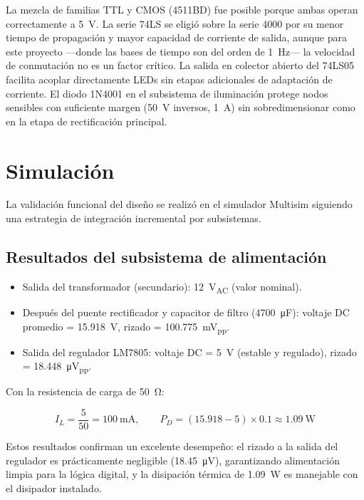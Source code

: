 \documentclass[10pt,onecolumn]{IEEEtran}
\begin{document}
La mezcla de familias TTL y CMOS (4511BD) fue posible porque ambas operan correctamente a \SI{5}{\volt}. La serie 74LS se eligió sobre la serie 4000 por su menor tiempo de propagación y mayor capacidad de corriente de salida, aunque para este proyecto —donde las bases de tiempo son del orden de \SI{1}{\hertz}— la velocidad de conmutación no es un factor crítico. La salida en colector abierto del 74LS05 facilita acoplar directamente LEDs sin etapas adicionales de adaptación de corriente. El diodo 1N4001 en el subsistema de iluminación protege nodos sensibles con suficiente margen (\SI{50}{\volt} inversos, \SI{1}{\ampere}) sin sobredimensionar como en la etapa de rectificación principal.



\section{Simulación}

La validación funcional del diseño se realizó en el simulador Multisim siguiendo una estrategia de integración incremental por subsistemas.

\subsection{Resultados del subsistema de alimentación}

\begin{itemize}
    \item Salida del transformador (secundario): \SI{12}{\volt_{AC}} (valor nominal).
    \item Después del puente rectificador y capacitor de filtro (\SI{4700}{\micro\farad}): voltaje DC promedio = \SI{15.918}{\volt}, rizado = \SI{100.775}{\milli\volt_{pp}}.
    \item Salida del regulador LM7805: voltaje DC = \SI{5}{\volt} (estable y regulado), rizado = \SI{18.448}{\micro\volt_{pp}}.
\end{itemize}

Con la resistencia de carga de \SI{50}{\ohm}:

\[
I_L = \frac{5}{50} = \SI{100}{\milli\ampere}, \qquad P_D = (15.918 - 5) \times 0.1 \approx \SI{1.09}{\watt}
\]

Estos resultados confirman un excelente desempeño: el rizado a la salida del regulador es prácticamente negligible (\SI{18.45}{\micro\volt}), garantizando alimentación limpia para la lógica digital, y la disipación térmica de \SI{1.09}{\watt} es manejable con el disipador instalado.
\end{document}
